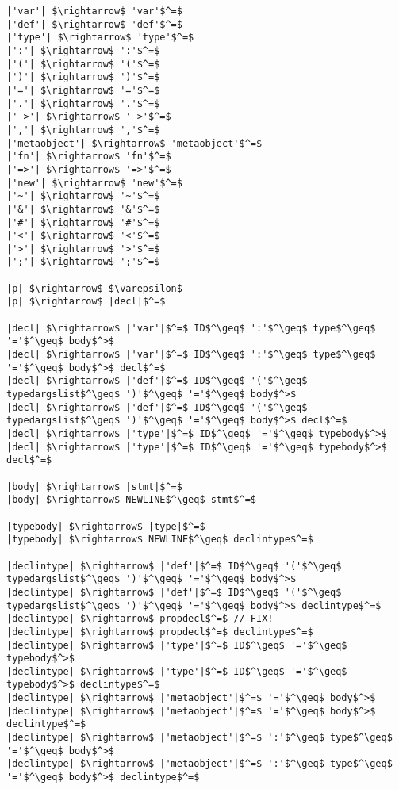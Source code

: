 
\begin{lstlisting}[mathescape]
|'var'| $\rightarrow$ 'var'$^=$
|'def'| $\rightarrow$ 'def'$^=$
|'type'| $\rightarrow$ 'type'$^=$
|':'| $\rightarrow$ ':'$^=$
|'('| $\rightarrow$ '('$^=$
|')'| $\rightarrow$ ')'$^=$
|'='| $\rightarrow$ '='$^=$
|'.'| $\rightarrow$ '.'$^=$
|'->'| $\rightarrow$ '->'$^=$
|','| $\rightarrow$ ','$^=$
|'metaobject'| $\rightarrow$ 'metaobject'$^=$
|'fn'| $\rightarrow$ 'fn'$^=$
|'=>'| $\rightarrow$ '=>'$^=$
|'new'| $\rightarrow$ 'new'$^=$
|'~'| $\rightarrow$ '~'$^=$
|'&'| $\rightarrow$ '&'$^=$
|'#'| $\rightarrow$ '#'$^=$
|'<'| $\rightarrow$ '<'$^=$
|'>'| $\rightarrow$ '>'$^=$
|';'| $\rightarrow$ ';'$^=$

|p| $\rightarrow$ $\varepsilon$
|p| $\rightarrow$ |decl|$^=$

|decl| $\rightarrow$ |'var'|$^=$ ID$^\geq$ ':'$^\geq$ type$^\geq$ '='$^\geq$ body$^>$
|decl| $\rightarrow$ |'var'|$^=$ ID$^\geq$ ':'$^\geq$ type$^\geq$ '='$^\geq$ body$^>$ decl$^=$
|decl| $\rightarrow$ |'def'|$^=$ ID$^\geq$ '('$^\geq$ typedargslist$^\geq$ ')'$^\geq$ '='$^\geq$ body$^>$
|decl| $\rightarrow$ |'def'|$^=$ ID$^\geq$ '('$^\geq$ typedargslist$^\geq$ ')'$^\geq$ '='$^\geq$ body$^>$ decl$^=$
|decl| $\rightarrow$ |'type'|$^=$ ID$^\geq$ '='$^\geq$ typebody$^>$
|decl| $\rightarrow$ |'type'|$^=$ ID$^\geq$ '='$^\geq$ typebody$^>$ decl$^=$

|body| $\rightarrow$ |stmt|$^=$
|body| $\rightarrow$ NEWLINE$^\geq$ stmt$^=$

|typebody| $\rightarrow$ |type|$^=$
|typebody| $\rightarrow$ NEWLINE$^\geq$ declintype$^=$

|declintype| $\rightarrow$ |'def'|$^=$ ID$^\geq$ '('$^\geq$ typedargslist$^\geq$ ')'$^\geq$ '='$^\geq$ body$^>$
|declintype| $\rightarrow$ |'def'|$^=$ ID$^\geq$ '('$^\geq$ typedargslist$^\geq$ ')'$^\geq$ '='$^\geq$ body$^>$ declintype$^=$
|declintype| $\rightarrow$ propdecl$^=$ // FIX!
|declintype| $\rightarrow$ propdecl$^=$ declintype$^=$
|declintype| $\rightarrow$ |'type'|$^=$ ID$^\geq$ '='$^\geq$ typebody$^>$
|declintype| $\rightarrow$ |'type'|$^=$ ID$^\geq$ '='$^\geq$ typebody$^>$ declintype$^=$
|declintype| $\rightarrow$ |'metaobject'|$^=$ '='$^\geq$ body$^>$
|declintype| $\rightarrow$ |'metaobject'|$^=$ '='$^\geq$ body$^>$ declintype$^=$
|declintype| $\rightarrow$ |'metaobject'|$^=$ ':'$^\geq$ type$^\geq$ '='$^\geq$ body$^>$
|declintype| $\rightarrow$ |'metaobject'|$^=$ ':'$^\geq$ type$^\geq$ '='$^\geq$ body$^>$ declintype$^=$


\end{lstlisting}
